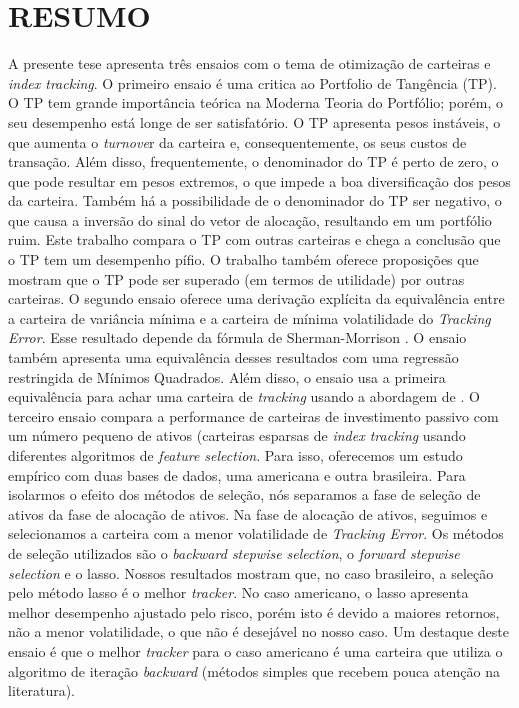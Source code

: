 \documentclass[12pt,oneside,a4paper]{memoir}
\begin{document}
\chapter*{RESUMO}

\noindent
A presente tese apresenta três ensaios com o tema de otimização de carteiras e \textit{index tracking}.
O primeiro ensaio é uma critica ao Portfolio de Tangência (TP).
O TP tem grande importância teórica na Moderna Teoria do Portfólio; porém, o seu desempenho está longe de ser satisfatório.
O TP apresenta pesos instáveis, o que aumenta o \textit{turnove}r da carteira e, consequentemente, os seus custos de transação.
Além disso, frequentemente, o denominador do TP é perto de zero, o que pode resultar em pesos extremos, o que impede a boa diversificação dos pesos da carteira.
Também há a possibilidade de o denominador do TP ser negativo, o que causa a inversão do sinal do vetor de alocação, resultando em um portfólio ruim.
Este trabalho compara o TP com outras carteiras e chega a conclusão que o TP tem um desempenho pífio.
O trabalho também oferece proposições que mostram que o TP pode ser superado (em termos de utilidade) por outras carteiras.
O segundo ensaio oferece uma derivação explícita da equivalência entre a carteira de variância mínima e a carteira de mínima volatilidade do \textit{Tracking Error}.
Esse resultado depende da fórmula de Sherman-Morrison .
O ensaio também apresenta uma equivalência desses resultados com uma regressão restringida de Mínimos Quadrados.
Além disso, o ensaio usa a primeira equivalência para achar uma carteira de \textit{tracking} usando a abordagem de .
O terceiro ensaio compara a performance de carteiras de investimento passivo com um número pequeno de ativos (carteiras esparsas de \textit{index tracking} usando diferentes algoritmos de \textit{feature selection}.
Para isso, oferecemos um estudo empírico com duas bases de dados, uma americana e outra brasileira.
Para isolarmos o efeito dos métodos de seleção, nós separamos a fase de seleção de ativos da fase de alocação de ativos.
Na fase de alocação de ativos, seguimos  e selecionamos a carteira com a menor volatilidade de \textit{Tracking Error}.
Os métodos de seleção utilizados são o \textit{backward stepwise selection}, o \textit{forward stepwise selection} e o lasso.
Nossos resultados mostram que, no caso brasileiro, a seleção pelo método lasso é o melhor \textit{tracker}.
No caso americano, o lasso apresenta melhor desempenho ajustado pelo risco, porém isto é devido a maiores retornos, não a menor volatilidade, o que não é desejável no nosso caso.
Um destaque deste ensaio é que o melhor \textit{tracker} para o caso americano é uma carteira que utiliza o algoritmo de iteração \textit{backward} (métodos simples que recebem pouca atenção na literatura).
\end{document}
